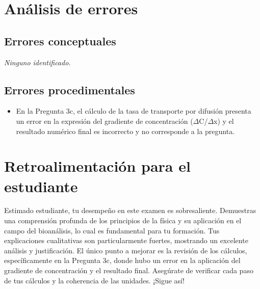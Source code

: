 \documentclass[11pt,a4paper]{article}
\begin{document}
\section*{Análisis de errores}

\subsection*{Errores conceptuales}
\textit{Ninguno identificado.}

\subsection*{Errores procedimentales}
\begin{itemize}[leftmargin=1.5em, itemsep=2pt]
  \item En la Pregunta 3c, el cálculo de la tasa de transporte por difusión presenta un error en la expresión del gradiente de concentración ($\Delta$C/$\Delta$x) y el resultado numérico final es incorrecto y no corresponde a la pregunta.
\end{itemize}

\section*{Retroalimentación para el estudiante}
\begin{tcolorbox}[cajaRecomendacion, title={Dirigido a: Krischel Bravo}]
Estimado estudiante, tu desempeño en este examen es sobresaliente. Demuestras una comprensión profunda de los principios de la física y su aplicación en el campo del bioanálisis, lo cual es fundamental para tu formación. Tus explicaciones cualitativas son particularmente fuertes, mostrando un excelente análisis y justificación. El único punto a mejorar es la revisión de los cálculos, específicamente en la Pregunta 3c, donde hubo un error en la aplicación del gradiente de concentración y el resultado final. Asegúrate de verificar cada paso de tus cálculos y la coherencia de las unidades. ¡Sigue así!
\end{tcolorbox}

\end{document}
